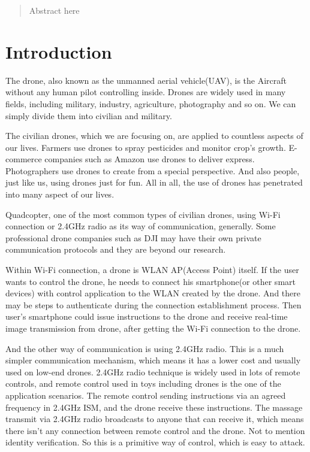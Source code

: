 \documentclass{acm_proc_article-sp}
\begin{document}
\maketitle
\begin{abstract}
Abstract here
\end{abstract}





\section{Introduction}

 The drone, also known as the unmanned aerial vehicle(UAV), is the Aircraft without  any human pilot controlling inside. Drones are widely used in many fields, including military, industry, agriculture, photography and so on. We can simply divide them into civilian and military. 
 
 The civilian drones, which we are focusing on, are applied to countless aspects of our lives.  Farmers use drones to spray pesticides and monitor crop's growth. E-commerce companies such as Amazon use drones to deliver express. Photographers use drones to create from a special perspective. And also people, just like us, using drones just for fun. All in all, the use of drones has penetrated into many aspect of our lives.
 
  Quadcopter, one of the most common types of civilian drones, using Wi-Fi connection or 2.4GHz radio as its way of communication, generally. Some professional drone companies such as DJI may have their own private communication protocols and they are beyond our research.
  
 Within Wi-Fi connection, a drone is WLAN AP(Access Point) itself. If the user wants to control the drone, he needs to connect his smartphone(or other smart devices) with control application to the WLAN created by the drone. And there may be steps to authenticate during the connection establishment process. Then user’s smartphone could issue instructions to the drone and receive real-time image transmission from drone, after getting the Wi-Fi connection to the drone.
 
 And the other way of communication is using 2.4GHz radio. This is a much simpler communication mechanism, which means it has a lower cost and usually used on low-end drones. 2.4GHz radio technique is widely used in lots of remote controls, and remote control used in toys including drones is the one of the application scenarios. The remote control sending instructions via an agreed frequency in 2.4GHz ISM, and the drone receive these instructions. The massage transmit via 2.4GHz radio broadcasts to anyone that can receive it, which means there isn't any connection between remote control and the drone. Not to mention identity verification. So this is a primitive way of control, which is easy to attack.
\end{document}
